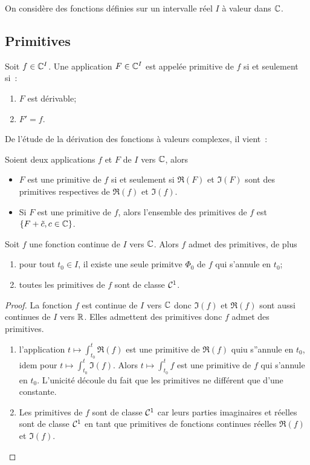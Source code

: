 On considère des fonctions définies sur un intervalle réel \(I\) à valeur dans \(\mathbb{C}\).

\subsection{Primitives}

\begin{defdef}
  Soit \(f \in \mathbb{C}^I\). Une application \(F \in \mathbb{C}^I\) est appelée primitive de \(f\) si et seulement si~:
  \begin{enumerate}
  \item \(F\) est dérivable;
  \item \(F'=f\).
  \end{enumerate}
\end{defdef}

De l'étude de la dérivation des fonctions à valeurs complexes, il vient~:
\begin{prop}
  Soient deux applications \(f\) et \(F\) de \(I\) vers \(\mathbb{C}\), alors
  \begin{itemize}
  \item \(F\) est une primitive de \(f\) si et seulement si \(\Re(F)\) et \(\Im(F)\) sont des primitives respectives de \(\Re(f)\) et \(\Im(f)\).
  \item Si \(F\) est une primitive de \(f\), alors l'ensemble des primitives de \(f\) est \(\{F+\tilde{c}, c \in \mathbb{C}\}\).
  \end{itemize}
\end{prop}

\begin{theo}
  Soit \(f\) une fonction continue de \(I\) vers \(\mathbb{C}\). Alors \(f\) admet des primitives, de plus
  \begin{enumerate}
  \item pour tout \(t_0 \in I\), il existe une seule primitve \(\Phi_0\) de \(f\) qui s'annule en \(t_0\);
  \item toutes les primitives de \(f\) sont de classe \(\mathcal{C}^{1}\).
  \end{enumerate}
\end{theo}
\begin{proof}
  La fonction \(f\) est continue de \(I\) vers \(\mathbb{C}\) donc \(\Im(f)\) et \(\Re(f)\) sont aussi continues de \(I\) vers \(\mathbb{R}\). Elles admettent des primitives donc \(f\) admet des primitives.
  \begin{enumerate}
  \item l'application \(t\longmapsto \int_{t_0}^t \Re(f)\) est une primitive de \(\Re(f)\) quiu s''annule en \(t_0\), idem pour \(t\longmapsto \int_{t_0}^t \Im(f)\). Alors \(t\longmapsto \int_{t_0}^t f\) est une primitive de \(f\) qui s'annule en \(t_0\). L'unicité découle du fait que les primitives ne différent que d'une constante.
  \item Les primitives de \(f\) sont de classe \(\mathcal{C}^{1}\) car leurs parties imaginaires et réelles sont de classe \(\mathcal{C}^{1}\) en tant que primitives de fonctions continues réelles \(\Re(f)\) et \(\Im(f)\).
  \end{enumerate}
\end{proof}

